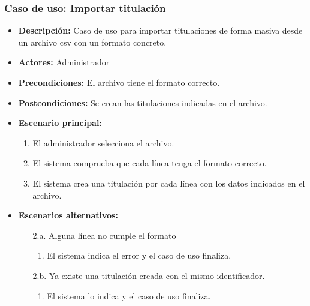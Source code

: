 \documentclass{book}
\begin{document}
\subsubsection*{Caso de uso: Importar titulación}
\begin{itemize}
\item{\bf Descripción:} Caso de uso para importar titulaciones de forma masiva desde un archivo csv con un formato concreto.
\item{\bf Actores:} Administrador
\item{\bf Precondiciones:} El archivo tiene el formato correcto.
\item{\bf Postcondiciones:} Se crean las titulaciones indicadas en el archivo.
\item{\bf Escenario principal:}
	\begin{enumerate}
	\item El administrador selecciona el archivo.
	\item El sistema comprueba que cada línea tenga el formato correcto.
	\item El sistema crea una titulación por cada línea con los datos indicados en el archivo.
	\end{enumerate}
\item{\bf Escenarios alternativos:}
	\begin{itemize}
		\item[2.a.] Alguna línea no cumple el formato
		\begin{enumerate}
			\item El sistema indica el error y el caso de uso finaliza.
		\end{enumerate}
		\item[2.b.] Ya existe una titulación creada con el mismo identificador.
		\begin{enumerate}
			\item El sistema lo indica y el caso de uso finaliza.
		\end{enumerate}
	\end{itemize}
\end{itemize}
\end{document}

